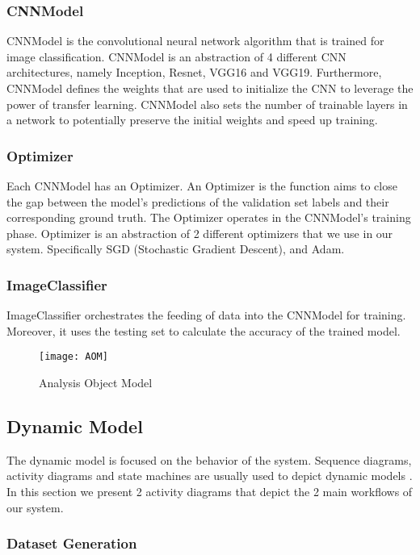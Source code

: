 \subsubsection{CNNModel}
CNNModel is the convolutional neural network algorithm that is trained for image classification. CNNModel is an abstraction of 4 different CNN architectures, namely Inception, Resnet, VGG16 and VGG19. Furthermore, CNNModel defines the weights that are used to initialize the CNN to leverage the power of transfer learning. CNNModel also sets the number of trainable layers in a network to potentially preserve the initial weights and speed up training.

\subsubsection{Optimizer}
Each CNNModel has an Optimizer. An Optimizer is the function aims to close the gap between the model's predictions of the validation set labels and their corresponding ground truth. The Optimizer operates in the CNNModel's training phase. Optimizer is an abstraction of 2 different optimizers that we use in our system. Specifically SGD (Stochastic Gradient Descent), and Adam.

\subsubsection{ImageClassifier}
ImageClassifier orchestrates the feeding of data into the CNNModel for training. Moreover, it uses the testing set to calculate the accuracy of the trained model.

\begin{figure}[H]
\centering
  \texttt{[image: AOM]}
\caption{Analysis Object Model}
\label{fig:AOM}
\end{figure}

\subsection{Dynamic Model}

The dynamic model is focused on the behavior of the system. Sequence diagrams, activity diagrams and state machines are usually used to depict dynamic models \cite{bruegge2004object}. In this section we present 2 activity diagrams that depict the 2 main workflows of our system.

\subsubsection{Dataset Generation}

